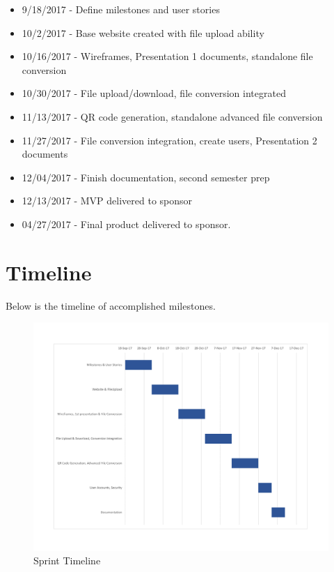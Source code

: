 \begin{itemize}
	\item 9/18/2017   - Define milestones and user stories

	\item 10/2/2017   - Base website created with file upload ability
	
	\item 10/16/2017  - Wireframes, Presentation 1 documents, standalone file conversion
	
	\item 10/30/2017  - File upload/download, file conversion integrated
	
	\item 11/13/2017  - QR code generation, standalone advanced file conversion 
	
	\item 11/27/2017  - File conversion integration, create users, Presentation 2 documents
	
	\item 12/04/2017  - Finish documentation, second semester prep
	
	\item 12/13/2017  - MVP delivered to sponsor
	
	\item 04/27/2017  - Final product delivered to sponsor.
\end{itemize}

\section{Timeline}
Below is the timeline of accomplished milestones.

\begin{figure}[H]
\begin{center}
\includegraphics[width=1\textwidth]{./SprintGanattChart}
\end{center}
\caption{Sprint Timeline}
\end{figure}

